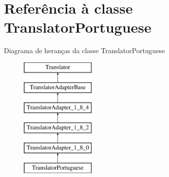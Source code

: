 \hypertarget{class_translator_portuguese}{\section{Referência à classe Translator\-Portuguese}
\label{class_translator_portuguese}
}
Diagrama de heranças da classe Translator\-Portuguese\begin{figure}[H]
\begin{center}
\leavevmode
\includegraphics[height=6.000000cm]{class_translator_portuguese}
\end{center}
\end{figure}
